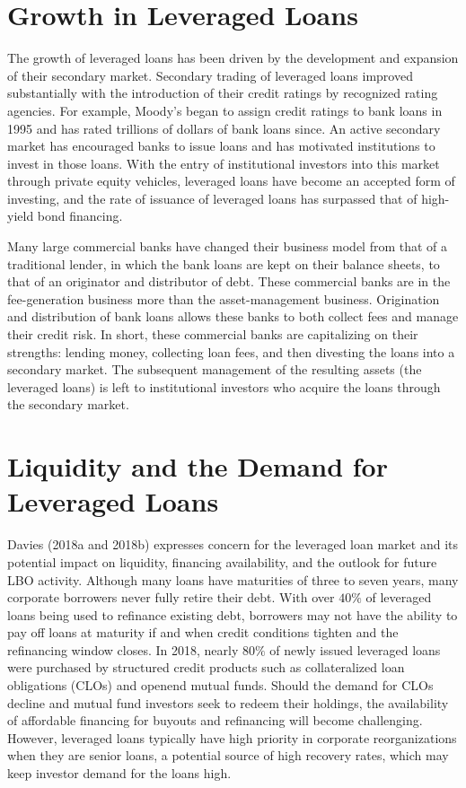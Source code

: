 \documentclass[11pt]{article}
\begin{document}
\section*{Growth in Leveraged Loans}
The growth of leveraged loans has been driven by the development and expansion of their secondary market. Secondary trading of leveraged loans improved substantially with the introduction of their credit ratings by recognized rating agencies. For example, Moody's began to assign credit ratings to bank loans in 1995 and has rated trillions of dollars of bank loans since. An active secondary market has encouraged banks to issue loans and has motivated institutions to invest in those loans. With the entry of institutional investors into this market through private equity vehicles, leveraged loans have become an accepted form of investing, and the rate of issuance of leveraged loans has surpassed that of high-yield bond financing.

Many large commercial banks have changed their business model from that of a traditional lender, in which the bank loans are kept on their balance sheets, to that of an originator and distributor of debt. These commercial banks are in the fee-generation business more than the asset-management business. Origination and distribution of bank loans allows these banks to both collect fees and manage their credit risk. In short, these commercial banks are capitalizing on their strengths: lending money, collecting loan fees, and then divesting the loans into a secondary market. The subsequent management of the resulting assets (the leveraged loans) is left to institutional investors who acquire the loans through the secondary market.

\section*{Liquidity and the Demand for Leveraged Loans}
Davies (2018a and 2018b) expresses concern for the leveraged loan market and its potential impact on liquidity, financing availability, and the outlook for future LBO activity. Although many loans have maturities of three to seven years, many corporate borrowers never fully retire their debt. With over $40 \%$ of leveraged loans being used to refinance existing debt, borrowers may not have the ability to pay off loans at maturity if and when credit conditions tighten and the refinancing window closes. In 2018, nearly $80 \%$ of newly issued leveraged loans were purchased by structured credit products such as collateralized loan obligations (CLOs) and openend mutual funds. Should the demand for CLOs decline and mutual fund investors seek to redeem their holdings, the availability of affordable financing for buyouts and refinancing will become challenging. However, leveraged loans typically have high priority in corporate reorganizations when they are senior loans, a potential source of high recovery rates, which may keep investor demand for the loans high.
\end{document}
